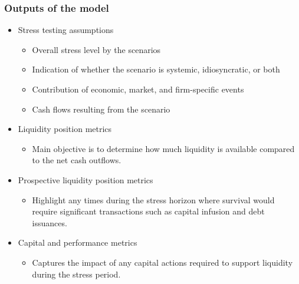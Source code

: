 \subsubsection{Outputs of the model}
\begin{itemize}
\item Stress testing assumptions
    \begin{itemize}
    \item Overall stress level by the scenarios
    \item Indication of whether the scenario is systemic, idiosyncratic, or both
    \item Contribution of economic, market, and firm-specific events
    \item Cash flows resulting from the scenario
    \end{itemize}
\item Liquidity position metrics
    \begin{itemize}
    \item Main objective is to determine how much liquidity is available compared to the net cash outflows.
    \end{itemize}
\item Prospective liquidity position metrics
    \begin{itemize}
    \item Highlight any times during the stress horizon where survival would require significant transactions such as capital infusion and debt issuances.
    \end{itemize}
\item Capital and performance metrics
    \begin{itemize}
    \item Captures the impact of any capital actions required to support liquidity during the stress period.
    \end{itemize}
\end{itemize}



